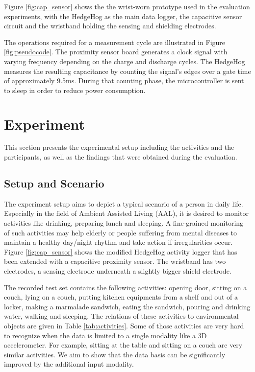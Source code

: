 \documentclass[runningheads,a4paper]{llncs}
\begin{document}
Figure \ref{fig:cap_sensor} shows the the wrist-worn prototype used in the evaluation experiments, with the HedgeHog as the main data logger, the capacitive sensor circuit and the wristband holding the sensing and shielding electrodes.

The operations required for a measurement cycle are illustrated in Figure \ref{fig:pseudocode}. The proximity sensor board generates a clock signal with varying frequency depending on the charge and discharge cycles. The HedgeHog measures the resulting capacitance by counting the signal's edges over a gate time of approximately 9.5ms. During that counting phase, the microcontroller is sent to sleep in order to reduce power consumption. 

\section{Experiment}
\label{sect:experiment}

This section presents the experimental setup including the activities and the participants, as well as the findings that were obtained during the evaluation.

\subsection{Setup and Scenario}

The experiment setup aims to depict a typical scenario of a person in daily life. Especially in the field of Ambient Assisted Living (AAL), it is desired to monitor activities like drinking, preparing lunch and sleeping. A fine-grained monitoring of such activities may help elderly or people suffering from mental diseases to maintain a healthy day/night rhythm and take action if irregularities occur. Figure \ref{fig:cap_sensor} shows the modified HedgeHog activity logger that has been extended with a capacitive proximity sensor. The wristband has two electrodes, a sensing electrode underneath a slightly bigger shield electrode. 

The recorded test set contains the following activities: opening door, sitting on a couch, lying on a couch, putting kitchen equipments from a shelf and out of a locker, making a marmalade sandwich, eating the sandwich, pouring and drinking water, walking and sleeping. The relations of these activities to environmental objects are given in Table \ref{tab:activities}. Some of those activities are very hard to recognize when the data is limited to a single modality like a 3D accelerometer. For example, sitting at the table and sitting on a couch are very similar activities. We aim to show that the data basis can be significantly improved by the additional input modality. 
\end{document}
